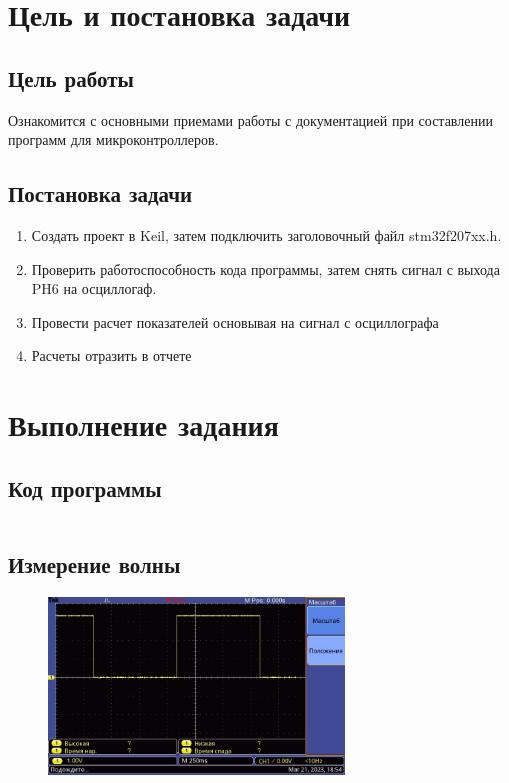 \documentclass[12pt]{article} %
\begin{document}
\begin{center}

\end{center}
\doublespacing
\tableofcontents
\newpage
\section{Цель и постановка задачи}
\subsection{Цель работы}
Ознакомится с основными приемами работы с документацией при составлении программ для микроконтроллеров.
\subsection{Постановка задачи}
\begin{enumerate}
\item Создать проект в Keil, затем подключить заголовочный файл stm32f207xx.h.
\item Проверить работоспособность кода программы, затем снять сигнал с выхода PH6 на осциллогаф.
\item Провести расчет показателей основывая на сигнал с осциллографа
\item Расчеты отразить в отчете
\end{enumerate}

\newpage
\section{Выполнение задания}
\subsection{Код программы}
\inputminted[firstline=1, lastline=18,breaklines ]{C}{F:/git/micro/Lab2/BlinkyLed.c}
\subsection{Измерение волны}
\begin{figure}[H] 
\centering \includegraphics[width = 0.7\textwidth]{graph.jpg}
\end{figure}
\end{document}
